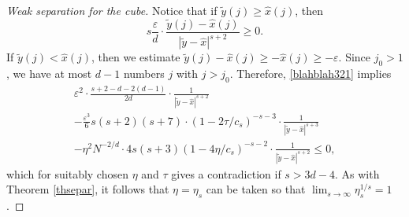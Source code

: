 \documentclass[12pt]{amsart}
\theoremstyle{definition}
\def\ep{\varepsilon}
\newcommand{\1}{\mathbf{1}}
\begin{document}
\begin{proof}[Weak separation for the cube]
Notice that if $\tilde{y}(j)\geqslant \hat{x}(j)$, then 
$$
s\frac{\ep}d \cdot  \frac{\tilde y(j)-\hat{x}(j)}{|\tilde y - \hat{x}|^{s+2}} \geqslant 0.
$$
If $\tilde{y}(j)<\hat{x}(j)$, then we estimate $\tilde{y}(j)-\hat{x}(j)\geqslant -\hat{x}(j) \geqslant -\ep$.  Since $j_0>1$, we have at most $d-1$ numbers $j$ with $j>j_0$. Therefore, \eqref{blahblah321} implies
\begin{multline}
\ep^2 \cdot \frac{s+2-d-2(d-1)}{2d} \cdot \frac{1}{|\tilde{y}-\hat{x}|^{s+2}}  \\
- \frac{\ep^3}6 s(s+2)(s+7) \cdot (1-2\tau/c_s)^{-s-3}\cdot \frac{1}{|\tilde y-\hat{x}|^{s+3}}  \\ 
-\eta^2 N^{-2/d}\cdot 4s (s+3)(1-4\eta/c_s)^{-s-2}\cdot \frac{1}{|\tilde y-\hat{x}|^{s+2}}\leqslant 0,
\end{multline}
which for suitably chosen $\eta$ and $\tau$ gives a contradiction if $s>3d-4$. As with Theorem \ref{thsepar}, it follows that $\eta=\eta_s$ can be taken so that $\lim_{s\to\infty}\eta_s^{1/s}=1$.

\end{proof}
\end{document}
